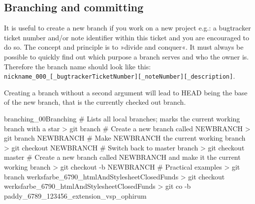 \subsection{Branching and committing}\label{sec:branching_and_comitting}
It is useful to create a new branch if you work on a new project e.g.: a bugtracker ticket number and/or note identifier within this ticket and you are encouraged to do so. The concept and principle is to »divide and conquer«. It must always be possible to quickly find out which purpose a branch serves and who the owner is. Therefore the branch name should look like this:\\ \texttt{nickname\_000\_{[\_bugtrackerTicketNumber]}{[\_noteNumber]}{[\_description]}}.

Creating a branch without a second argument will lead to HEAD being the base of the new branch, that is the currently checked out branch.
\begin{codelisting}{branching_00}{Branching}
# Lists all local branches; marks the current working branch with a star
> git branch
# Create a new branch called NEWBRANCH
> git branch NEWBRANCH
# Make NEWBRANCH the current working branch
> git checkout NEWBRANCH
# Switch back to master branch
> git checkout master
# Create a new branch called NEWBRANCH and make it the current working branch
> git checkout -b NEWBRANCH
# Practical examples
> git branch werksfarbe_6790_htmlAndStylesheetClosedFunds
> git checkout werksfarbe_6790_htmlAndStylesheetClosedFunds
> git co -b paddy_6789_123456_extension_vsp_ophirum
\end{codelisting}
